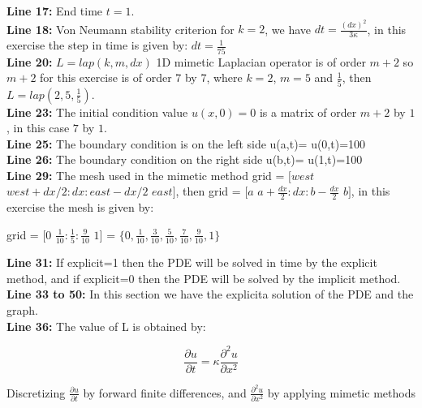 \textbf{Line 17:} End time $t=1$.\\

\textbf{Line 18:} Von Neumann stability criterion for $k=2$, we have $ dt = \frac{(dx)^{2}}{3 \kappa}$, in this exercise the step in time is given by: $dt =\frac{1}{75}$\\

\textbf{Line 20:} $L = lap(k,m,dx)$ 1D mimetic Laplacian operator is of order $m+2$ so $m+2$ for this exercise is of order 7 by 7, where $k=2$, $m = 5$ and $\frac{1}{5}$, then $L = lap(2,5,\frac{1}{5})$.\\

\textbf{Line 23:} The initial condition  value $u(x,0)=0$ is a matrix of order $m+2$ by $1$, in this case $7$ by $1$.\\

\textbf{Line 25:} The boundary condition is on the left side u(a,t)= u(0,t)=100\\

\textbf{Line 26:} The boundary condition on the right side u(b,t)= u(1,t)=100\\

\textbf{Line 29:} The mesh used in the mimetic method  grid = $[west$  $west+dx/2: dx :east-dx/2$  $east]$, then grid = $[a$ $a+\frac{dx}{2}: dx : b-\frac{dx}{2}$ $b  ]$, in this exercise the mesh is given by:

\begin{center}

    grid = $[0$ $\frac{1}{10}: \frac{1}{5}: \frac{9}{10}$ $1]$ = $  \{0, \frac{1}{10}, \frac{3}{10}, \frac{5}{10}, \frac{7}{10}, \frac{9}{10}, 1 \}$

\end{center}

\textbf{Line 31:} If explicit=1 then the PDE will be solved in time by the explicit method, and if explicit=0 then the PDE will be solved by the implicit method.\\

\textbf{Line 33 to 50:} In this section we have the explicita solution of the PDE and the graph. \\

\textbf{Line 36:} The value of L is obtained by:

\begin{equation}
    \frac{\partial u}{\partial t} = \kappa \frac{\partial^{2} u}{\partial x^{2}}
\end{equation}

Discretizing $\frac{\partial u}{\partial t}$ by forward finite differences, and $\frac{\partial^{2} u}{\partial x^{2}}$ by applying mimetic methods

